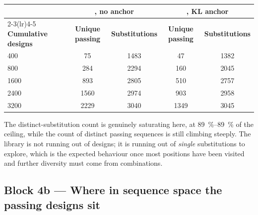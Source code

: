 \begin{center}
\begin{tabular}{@{}lcccc@{}}
\toprule
& \multicolumn{2}{c}{\textbf{\cleo{}, no anchor}} &
  \multicolumn{2}{c}{\textbf{\cleo{}, KL anchor}} \\
\cmidrule(lr){2-3}\cmidrule(lr){4-5}
\textbf{Cumulative designs} & \textbf{Unique passing} & \textbf{Substitutions} &
\textbf{Unique passing} & \textbf{Substitutions} \\
\midrule
400  & 75   & 1483 & 47   & 1382 \\
800  & 284  & 2294 & 160  & 2045 \\
1600 & 893  & 2805 & 510  & 2757 \\
2400 & 1560 & 2974 & 903  & 2958 \\
3200 & 2229 & 3040 & 1349 & 3045 \\
\bottomrule
\end{tabular}
\end{center}

The distinct-substitution count is genuinely saturating here, at
\SIrange{89}{89}{\percent} of the ceiling, while the count of distinct passing
sequences is still climbing steeply. The library is not running out of designs;
it is running out of \emph{single} substitutions to explore, which is the
expected behaviour once most positions have been visited and further diversity
must come from combinations.


\subsection*{Block 4b --- Where in sequence space the passing designs sit}

